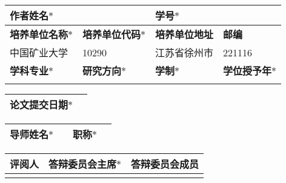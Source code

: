 {	{
		\begin{tabularx}{15.05cm}{|X|X|X|X|}
			\hline
			{\bfseries 作者姓名$\bm \ast$} & { \@author } & {\bfseries 学号$\bm \ast$} & {   } \\ \hline
			{\bfseries 培养单位名称$\bm \ast$} & {\bfseries 培养单位代码$\bm \ast$} & {\bfseries 培养单位地址} & {\bfseries 邮编}\\ \hline
			中国矿业大学 & 10290 & 江苏省徐州市 & 221116 \\ \hline
			{\bfseries 学科专业$\bm \ast$} & {\bfseries 研究方向$\bm \ast$} & {\bfseries 学制$\bm \ast$} & {\bfseries 学位授予年$\bm \ast$}\\ \hline
			{ \@major } & { \@research } & {  }  & { \@year }\\
			\hline
		\end{tabularx}
	}
	
	\vskip -1.3pt
	
	{
		\begin{tabularx}{15.05cm}{|p{6cm}<{\centering}|X|}
			\hline
			{\bfseries 论文提交日期$\bm \ast$} & { } \\
			\hline
		\end{tabularx}
	}
	
	\vskip -1.3pt
	
	{
		\zihao{5}
		\begin{tabularx}{15.05cm}{|X|X|X|X|}
			\hline
			{\bfseries 导师姓名$\bm \ast$} & {\@instructor} & {\bfseries 职称$\bm \ast$} & {  \@TTPP  }\\
			\hline
		\end{tabularx}
	}
	
	\vskip -1.3pt
	
	{
		\zihao{5}
		\begin{tabularx}{15.05cm}{|p{5.9cm}<{\centering}|p{3.2cm}<{\centering}|X|}
			\hline
			{\bfseries 评阅人} & {\bfseries 答辩委员会主席$\bm \ast$} & {\bfseries 答辩委员会成员} \\ \hline
			{   } & {   } & {   } \\
			\hline
		\end{tabularx}
	}
	
	\vskip -1.3pt
	
}

